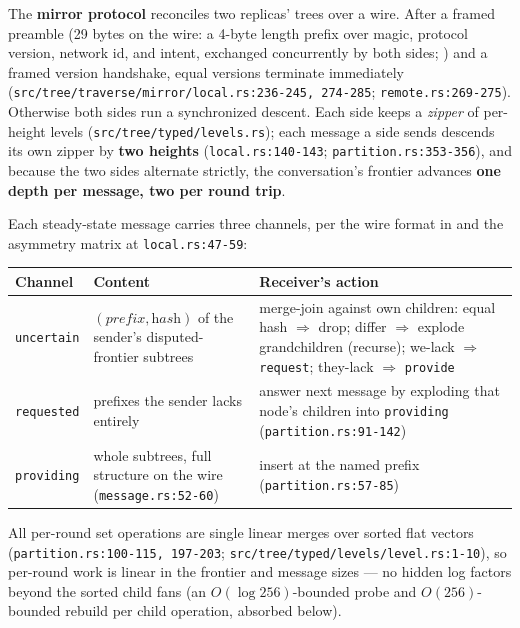 \documentclass[11pt]{article}
\newcommand{\code}[1]{\texttt{#1}}
\theoremstyle{plain}
\begin{document}
The \textbf{mirror protocol} reconciles two replicas' trees over a wire.
After a framed preamble (29 bytes on the wire: a 4-byte length prefix over
magic, protocol version, network id, and intent, exchanged concurrently by
both sides; )
and a framed version handshake, equal versions terminate immediately
(\code{src/tree/traverse/mirror/local.rs:236-245, 274-285};
\code{remote.rs:269-275}). Otherwise both sides run a synchronized descent.
Each side keeps a \emph{zipper} of per-height levels
(\code{src/tree/typed/levels.rs}); each message a side sends descends its
own zipper by \textbf{two heights} (\code{local.rs:140-143};
\code{partition.rs:353-356}), and because the two sides alternate strictly,
the conversation's frontier advances \textbf{one depth per message, two per
round trip}.

Each steady-state message carries three channels, per the wire format in
 and the asymmetry matrix
at \code{local.rs:47-59}:

\begin{center}
\begin{tabular}{@{}L{0.14\textwidth}L{0.32\textwidth}L{0.44\textwidth}@{}}
\toprule
Channel & Content & Receiver's action \\
\midrule
\code{uncertain} &
$(\textit{prefix}, \textit{hash})$ of the sender's disputed-frontier
subtrees &
merge-join against own children: equal hash $\Rightarrow$ drop; differ
$\Rightarrow$ explode grandchildren (recurse); we-lack $\Rightarrow$
\code{request}; they-lack $\Rightarrow$ \code{provide} \\
\addlinespace
\code{requested} &
prefixes the sender lacks entirely &
answer next message by exploding that node's children into \code{providing}
(\code{partition.rs:91-142}) \\
\addlinespace
\code{providing} &
whole subtrees, full structure on the wire (\code{message.rs:52-60}) &
insert at the named prefix (\code{partition.rs:57-85}) \\
\bottomrule
\end{tabular}
\end{center}

All per-round set operations are single linear merges over sorted flat
vectors (\code{partition.rs:}\allowbreak\code{100-115, 197-203};
\code{src/tree/typed/}\allowbreak\code{levels/level.rs:1-10}), so per-round work
is linear in the
frontier and message sizes --- no hidden log factors beyond the sorted
child fans (an $O(\log 256)$-bounded probe and $O(256)$-bounded rebuild
per child operation, absorbed below).
\end{document}
